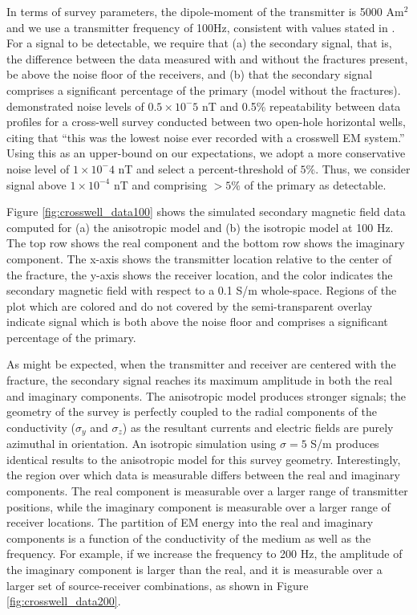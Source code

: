 In terms of survey parameters, the dipole-moment of the transmitter is 5000 Am$^2$ and we use a transmitter frequency of 100Hz, consistent with values stated in \cite{Wilt1995, Wilt2003}. For a signal to be detectable, we require that (a) the secondary signal, that is, the difference between the data measured with and without the fractures present, be above the noise floor of the receivers, and (b) that the secondary signal comprises a significant percentage of the primary (model without the fractures). \cite{Marsala2015a} demonstrated noise levels of $0.5 \times 10^-5$ nT and 0.5\% repeatability between data profiles for a cross-well survey conducted between two open-hole horizontal wells, citing that ``this was the lowest noise ever recorded with a crosswell EM system.'' Using this as an upper-bound on our expectations, we adopt a more conservative noise level of $1\times10^-4$ nT and select a percent-threshold of $5\%$. Thus, we consider signal above $1\times10^{-4}$ nT and comprising $>5\%$ of the primary as detectable.

Figure \ref{fig:crosswell_data100} shows the simulated secondary magnetic field data computed for (a) the anisotropic model and (b) the isotropic model at 100 Hz. The top row shows the real component and the bottom row shows the imaginary component. The x-axis shows the transmitter location relative to the center of the fracture, the y-axis shows the receiver location, and the color indicates the secondary magnetic field with respect to a 0.1 S/m whole-space. Regions of the plot which are colored and do not covered by the semi-transparent overlay indicate signal which is both above the noise floor and comprises a significant percentage of the primary.




As might be expected, when the transmitter and receiver are centered with the fracture, the secondary signal reaches its maximum amplitude in both the real and imaginary components. The anisotropic model produces stronger signals; the geometry of the survey is perfectly coupled to the radial components of the conductivity ($\sigma_y$ and $\sigma_z$) as the resultant currents and electric fields are purely azimuthal in orientation. An isotropic simulation using $\sigma = 5$ S/m produces identical results to the anisotropic model for this survey geometry. Interestingly, the region over which data is measurable differs between the real and imaginary components. The real component is measurable over a larger range of transmitter positions, while the imaginary component is measurable over a larger range of receiver locations. The partition of EM energy into the real and imaginary components is a function of the conductivity of the medium as well as the frequency. For example, if we increase the frequency to 200 Hz, the amplitude of the imaginary component is larger than the real, and it is measurable over a larger set of source-receiver combinations, as shown in Figure \ref{fig:crosswell_data200}.

